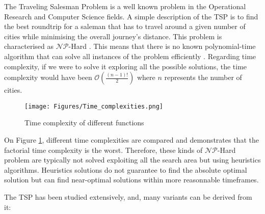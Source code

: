 The Traveling Salesman Problem is a well known problem in the Operational Research and Computer Science fields. A simple description of the TSP is to find the best roundtrip for a saleman that has to travel around a given number of cities while minimising the overall journey's distance.
This problem is characterised as $\mathcal{NP}$-Hard \cite{np_hardness}. This means that there is no known polynomial-time algorithm that can solve all instances of the problem efficiently . Regarding time complexity, if we were to solve it exploring all the possible solutions, the time complexity would have been $\mathcal{O}(\frac{(n-1)!}{2})$ where $n$ represents the number of cities.

\begin{figure}[!ht]
    \centering
    \texttt{[image: Figures/Time\_complexities.png]}
    \caption{Time complexity of different functions}
    \label{fig:time_complexity_comparisons}
\end{figure}

On Figure \ref{fig:time_complexity_comparisons}, different time complexities are compared and demonstrates that the factorial time complexity is the worst. Therefore, these kinds of $\mathcal{NP}$-Hard problem are typically not solved exploiting all the search area but using heuristics algorithms. Heuristics solutions do not guarantee to find the absolute optimal solution but can find near-optimal solutions within more reasonnable timeframes.

The TSP has been studied extensively, and, many variants can be derived from it:

